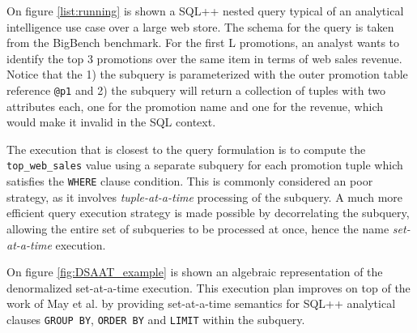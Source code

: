 \begin{minipage}{\linewidth}

\end{minipage}

On figure \ref{list:running} is shown a SQL++ nested query typical of an analytical intelligence use case over a large web store. The schema for the query is taken from the BigBench \cite{ghazal:2013aa} benchmark. For the first L promotions, an analyst wants to identify the top 3 promotions over the same item in terms of web sales revenue. Notice that the 1) the subquery is parameterized with the outer promotion table reference \texttt{@p1} and 2) the subquery will return a collection of tuples with two attributes each, one for the promotion name and one for the revenue, which would make it invalid in the SQL context. 

The execution that is closest to the query formulation is to compute the \texttt{top\_web\_sales} value using a separate subquery for each promotion tuple which satisfies the \texttt{WHERE} clause condition. This is commonly considered an poor strategy, as it involves \emph{tuple-at-a-time} processing of the subquery.  A much more efficient query execution strategy is made possible by decorrelating the subquery, allowing the entire set of subqueries to be processed at once, hence the name \emph{set-at-a-time} execution.


On figure \ref{fig:DSAAT_example} is shown an algebraic representation of the denormalized set-at-a-time execution. This execution plan improves on top of the work of May et al. \cite{may:2003aa} by providing set-at-a-time semantics for SQL++ analytical clauses \texttt{GROUP BY}, \texttt{ORDER BY} and \texttt{LIMIT} within the subquery.

